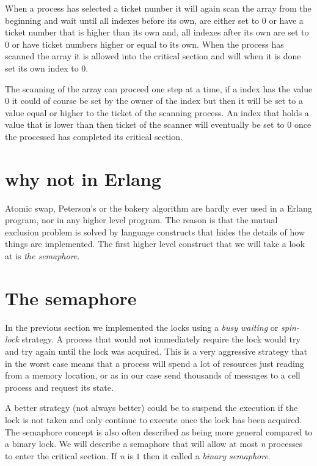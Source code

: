 \documentclass[a4paper,11pt]{article}
\begin{document}
When a process has selected a ticket number it will again scan the
array from the beginning and wait until all indexes before its own, are
either set to $0$
or have a ticket number that is higher than its own and, all indexes
after its own are set to $0$
or have ticket numbers higher or equal to its own. When the process
has scanned the array it is allowed into the critical section and will
when it is done set its own index to $0$.

The scanning of the array can proceed one step at a time, if a index
has the value $0$
it could of course be set by the owner of the index but then it will be
set to a value equal or higher to the ticket of the scanning
process. An index that holds a value that is lower than then ticket of
the scanner will eventually be set to $0$
once the processed has completed its critical section. 

\section{why not in Erlang}

Atomic swap, Peterson's or the bakery algorithm are hardly ever used
in a Erlang program, nor in any higher level program. The reason is
that the mutual exclusion problem is solved by language constructs that
hides the details of how things are implemented. The first higher level construct that we will take a look at is {\em the semaphore}.

\section{The semaphore}

In the previous section we implemented the locks using a {\em busy
  waiting} or {\em spin-lock} strategy. A process that would not
immediately require the lock would try and try again until the lock
was acquired. This is a very aggressive strategy that in the worst case
means that a process will spend a lot of resources just reading from a
memory location, or as in our case send thousands of messages to a
cell process and request its state.

A better strategy (not always better) could be to suspend the
execution if the lock is not taken and only continue to execute once
the lock has been acquired. The semaphore concept is also often
described as being more general compared to a binary lock. We will
describe a semaphore that will allow at most {\em n} processes to
enter the critical section. If {\em n} is $1$
then it called a {\em binary semaphore}.
\end{document}
